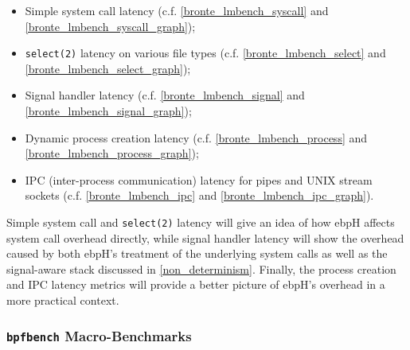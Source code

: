 \documentclass[
  12pt]{findlay}
\newcommand{\passthrough}[1]{#1}
\providecommand{\tightlist}{\setlength{\itemsep}{0pt}\setlength{\parskip}{0pt}}
\begin{document}
\begin{itemize}
\tightlist
\item
  Simple system call latency (c.f. \autoref{bronte_lmbench_syscall} and
  \autoref{bronte_lmbench_syscall_graph});
\item
  \passthrough{\lstinline!select(2)!} latency on various file types
  (c.f. \autoref{bronte_lmbench_select} and
  \autoref{bronte_lmbench_select_graph});
\item
  Signal handler latency (c.f. \autoref{bronte_lmbench_signal} and
  \autoref{bronte_lmbench_signal_graph});
\item
  Dynamic process creation latency (c.f.
  \autoref{bronte_lmbench_process} and
  \autoref{bronte_lmbench_process_graph});
\item
  IPC (inter-process communication) latency for pipes and UNIX stream
  sockets (c.f. \autoref{bronte_lmbench_ipc} and
  \autoref{bronte_lmbench_ipc_graph}).
\end{itemize}

Simple system call and \passthrough{\lstinline!select(2)!} latency will
give an idea of how ebpH affects system call overhead directly, while
signal handler latency will show the overhead caused by both ebpH's
treatment of the underlying system calls as well as the signal-aware
stack discussed in \autoref{non_determinism}. Finally, the process
creation and IPC latency metrics will provide a better picture of ebpH's
overhead in a more practical context.

\hypertarget{bpfbench-macro-benchmarks}{%
\subsubsection{\texorpdfstring{\texttt{bpfbench}
Macro-Benchmarks}{bpfbench Macro-Benchmarks}}\label{bpfbench-macro-benchmarks}}
\end{document}
